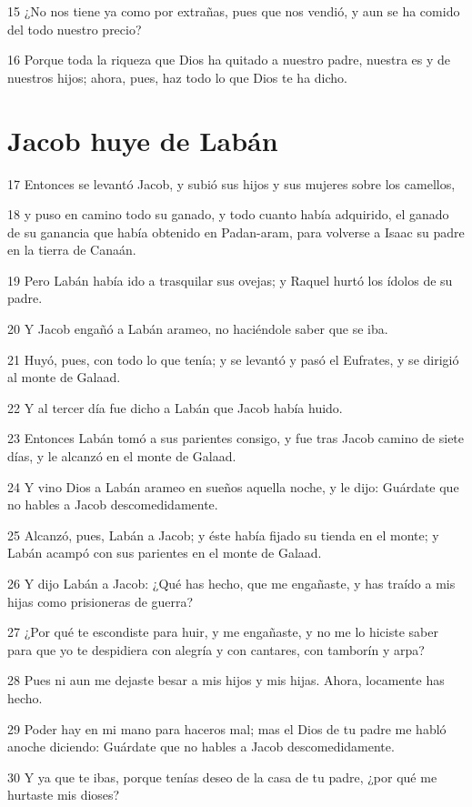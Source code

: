 15 ¿No nos tiene ya como por extrañas, pues que nos vendió, y aun se ha comido del todo nuestro precio?

16 Porque toda la riqueza que Dios ha quitado a nuestro padre, nuestra es y de nuestros hijos; ahora, pues, haz todo lo que Dios te ha dicho.

\section{Jacob huye de Labán}

17 Entonces se levantó Jacob, y subió sus hijos y sus mujeres sobre los camellos,

18 y puso en camino todo su ganado, y todo cuanto había adquirido, el ganado de su ganancia que había obtenido en Padan-aram, para volverse a Isaac su padre en la tierra de Canaán.

19 Pero Labán había ido a trasquilar sus ovejas; y Raquel hurtó los ídolos de su padre.

20 Y Jacob engañó a Labán arameo, no haciéndole saber que se iba.

21 Huyó, pues, con todo lo que tenía; y se levantó y pasó el Eufrates, y se dirigió al monte de Galaad.

22 Y al tercer día fue dicho a Labán que Jacob había huido.

23 Entonces Labán tomó a sus parientes consigo, y fue tras Jacob camino de siete días, y le alcanzó en el monte de Galaad.

24 Y vino Dios a Labán arameo en sueños aquella noche, y le dijo: Guárdate que no hables a Jacob descomedidamente.

25 Alcanzó, pues, Labán a Jacob; y éste había fijado su tienda en el monte; y Labán acampó con sus parientes en el monte de Galaad.

26 Y dijo Labán a Jacob: ¿Qué has hecho, que me engañaste, y has traído a mis hijas como prisioneras de guerra?

27 ¿Por qué te escondiste para huir, y me engañaste, y no me lo hiciste saber para que yo te despidiera con alegría y con cantares, con tamborín y arpa?

28 Pues ni aun me dejaste besar a mis hijos y mis hijas. Ahora, locamente has hecho.

29 Poder hay en mi mano para haceros mal; mas el Dios de tu padre me habló anoche diciendo: Guárdate que no hables a Jacob descomedidamente.

30 Y ya que te ibas, porque tenías deseo de la casa de tu padre, ¿por qué me hurtaste mis dioses?

